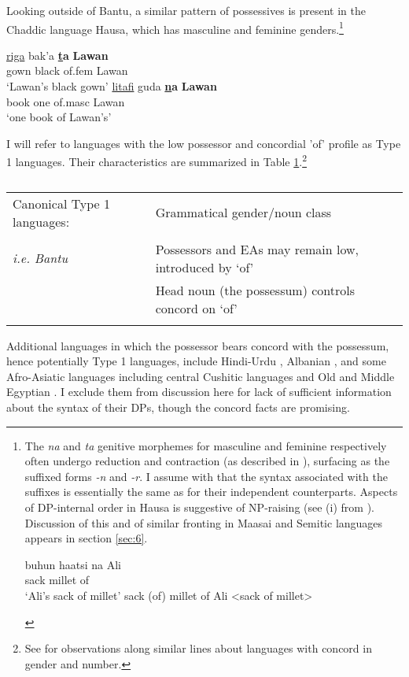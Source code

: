 \documentclass[output=paper
,modfonts
,nonflat]{langsci/langscibook}
\begin{document}
Looking outside of Bantu, a similar pattern of possessives is present in the Chaddic language Hausa, which has masculine and feminine genders.\footnote{The \textit{na} and \textit{ta} genitive morphemes for masculine and feminine respectively often undergo reduction and contraction (as described in \citealt{Tuller1986}), surfacing as the suffixed forms \textit{-n} and \textit{-r}. I assume with \citet{Tuller1986} that the syntax associated with the suffixes is essentially the same as for their independent counterparts. Aspects of DP-internal order in Hausa is suggestive of NP-raising (see (i) from \citealt[30]{Tuller1986}). Discussion of this and of similar fronting in Maasai and Semitic languages appears in section \ref{sec:6}.
\begin{exe}
	\ex 
	\xlist
	\ex 
	\gll buhun haatsi na Ali\\
	sack     millet  of\\
	\glt `Ali's sack of millet'  	
	\ex {\lbrack}sack (of) millet{\rbrack} of Ali <sack of millet>
	
	\endxlist
\end{exe}}

\begin{exe}
	\ex \label{ex:12} \citep[301]{Newman2000}
	\xlist
	\ex 
	\gll \underline{riga}   bak’a   \textbf{\underline{t}a}       \textbf{Lawan} \\
	gown   black   of.fem    Lawan\\
	\glt `Lawan’s black gown'  	
	\ex 
	\gll \underline{litafi}     guda \textbf{\underline{n}a}       \textbf{Lawan}\\
	book one  of.masc  Lawan\\
	\glt `one book of Lawan's'
	\endxlist
\end{exe}
I will refer to languages with the low possessor and concordial 'of' profile as Type 1 languages. Their characteristics are summarized in Table \ref{tab:1}.\footnote{See \citealt{Giusti2008} for observations along similar lines about languages with concord in gender and number.} 
\begin{table}
	\caption{}
	\label{tab:1}
	\begin{tabularx}{\textwidth}{lX}
		\lsptoprule
		Canonical Type 1 languages: & Grammatical gender/noun class\\ \\
		\textit{i.e. Bantu} & Possessors and EAs may remain low, introduced by ‘of’\\
		& Head noun (the possessum) controls concord on ‘of’\\
		\lspbottomrule
	\end{tabularx}
\end{table}  \noindent
Additional languages in which the possessor bears concord with the possessum, hence potentially Type 1 languages, include Hindi-Urdu \citep{Bogel_Butt2013}, Albanian \citep{Spencer2007}, and some Afro-Asiatic languages including central Cushitic languages \citep{Hetzron1995} and Old and Middle Egyptian \citep{Haspelmath2015}. I exclude them from discussion here for lack of sufficient information about the syntax of their DPs, though the concord facts are promising.
\end{document}
